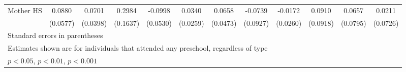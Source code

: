 \begin{table}[htbp]
\begin{tabular}{l*{11}{c}}
\addlinespace
Mother HS   &      0.0880         &      0.0701         &      0.2984         &     -0.0998         &      0.0340         &      0.0658         &     -0.0739         &     -0.0172         &      0.0910         &      0.0657         &      0.0211         \\
            &    (0.0577)         &    (0.0398)         &    (0.1637)         &    (0.0530)         &    (0.0259)         &    (0.0473)         &    (0.0927)         &    (0.0260)         &    (0.0918)         &    (0.0795)         &    (0.0726)         \\
\bottomrule
\multicolumn{12}{l}{\footnotesize Standard errors in parentheses}\\
\multicolumn{12}{l}{\footnotesize Estimates shown are for individuals that attended any preschool, regardless of type}\\
\multicolumn{12}{l}{\footnotesize \sym{*} \(p<0.05\), \sym{**} \(p<0.01\), \sym{***} \(p<0.001\)}\\
\end{tabular}
\end{table}
